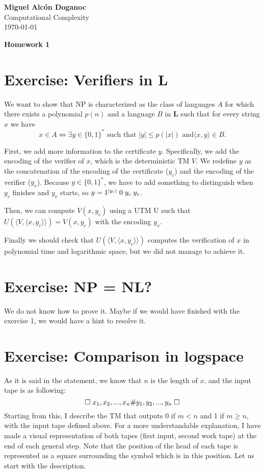 \documentclass[a4paper, 10pt]{article}
\begin{document}
\noindent
\begin{flushright}
    \large\textbf{Miguel Alcón Doganoc} \\
    Computational Complexity \\
    \today
\end{flushright}

\noindent
{\huge{\textbf{Homework 1}}}

\section{Exercise: Verifiers in L}
We want to show that NP is characterized as the class of languages $A$ for which there exists a polynomial $p(n)$ and a language $B$ in \textbf{L} such that for every string $x$ we have
\[
    x \in A \Leftrightarrow \exists y \in \{0,1\}^* \text{ such that } |y| \leq p(|x|) \text{ and} \langle x,y \rangle \in B.    
\]

First, we add more information to the certificate $y$. Specifically, we add the encoding of the verifier of $x$, which is the deterministic TM $V$. We redefine $y$ as the concatenation of the encoding of the certificate ($y_c$) and the encoding of the verifier ($y_v$). Because $y \in \{0,1\}^*$, we have to add something to distinguish when $y_c$ finishes and $y_v$ starts, so  $y = 1^{|y_c|}\hspace{1mm} 0 \hspace{1mm} y_c \hspace{1mm}  y_v$.

Then, we can compute $V(x,y_c)$ using a UTM U such that $U(\langle V, \langle x,y_c \rangle \rangle) = V(x,y_c)$ with the encoding $y_v$.

Finally we should check that $U(\langle V, \langle x,y_c \rangle \rangle)$ computes the verification of $x$ in polynomial time and logarithmic space, but we did not manage to achieve it.

\section{Exercise: NP = NL?}
We do not know how to prove it. Maybe if we would have finished with the exercise 1, we would have a hint to resolve it.

\section{Exercise: Comparison in logspace}

As it is said in the statement, we know that $n$ is the length of $x$, and the input tape is as following:
\[
    \square \hspace{1mm} x_1,x_2,...,x_n \# y_1,y_2,...,y_n \hspace{1mm} \square
\]
Starting from this, I describe the TM that outputs 0 if $m < n$ and 1 if $m \geq n$, with the input tape defined above. For a more understandable explanation, I have made a visual representation of both tapes (first input, second work tape) at the end of each general step. Note that the position of the head of each tape is represented as a square surrounding the symbol which is in this position. Let us start with the description.
\end{document}
